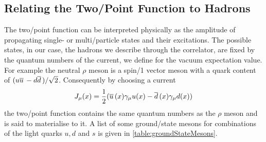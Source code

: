 \documentclass[../../index.tex]{subfiles}
\begin{document}
\subsection{Relating the Two\-/Point Function to Hadrons}
The two\-/point function can be interpreted physically as the amplitude of
propagating single- or multi\-/particle states and their excitations. The
possible states, in our case, the hadrons we describe through the correlator,
are fixed by the quantum numbers of the current, we define for the vacuum
expectation value. For example the neutral \(\rho\) meson is a spin\-/1 vector
meson with a quark content of \((u\overline{u}\, - d\overline{d}\,)/\sqrt{2}\). Consequently
by choosing a current
\begin{equation}
  J_\mu(x) = \frac{1}{2} ( \overline{u}\,(x)\gamma_\mu u(x) - \overline{d}\,(x)\gamma_\mu d(x) )
\end{equation}
the two\-/point function contains the same quantum numbers as the \(\rho\) meson
and is said to materialise to it. A list of some ground\-/state mesons for
combinations of the light quarks \(u, d\) and \(s\) is given in
\cref{table:groundStateMesons}.
\end{document}
